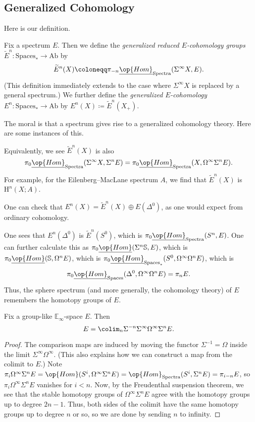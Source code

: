 \documentclass[../notes.tex]{subfiles}
\begin{document}
\subsection{Generalized Cohomology}
Here is our definition.
\begin{definition}
	Fix a spectrum $E$. Then we define the \textit{generalized reduced $E$-coho\-mo\-logy groups} $\widetilde E^n\colon\mathrm{Spaces}_*\to\mathrm{Ab}$ by
	\[\widetilde E^n(X)\coloneqq\pi_{-n}\underline{\op{Hom}}_{\mathrm{Spectra}}(\Sigma^\infty X,E).\]
	(This definition immediately extends to the case where $\Sigma^\infty X$ is replaced by a general spectrum.) We further define the \textit{generalized $E$-cohomology} $E^n\colon\mathrm{Spaces}_*\to\mathrm{Ab}$ by $E^n(X)\coloneqq\widetilde E^n(X_+)$.
\end{definition}
The moral is that a spectrum gives rise to a generalized cohomology theory. Here are some instances of this.
\begin{remark}
	Equivalently, we see $\widetilde E^n(X)$ is also
	\[\pi_0\underline{\op{Hom}}_{\mathrm{Spectra}}(\Sigma^\infty X,\Sigma^nE)=\pi_0\underline{\op{Hom}}_{\mathrm{Spectra}}(X,\Omega^\infty\Sigma^nE).\]
	For example, for the Eilenberg--MacLane spectrum $A$, we find that $\widetilde E^n(X)$ is $\mathrm H^n(X;A)$.
\end{remark}
\begin{remark}
	One can check that $E^n(X)=\widetilde E^n(X)\oplus E\left(\Delta^0\right)$, as one would expect from ordinary cohomology.
\end{remark}
\begin{remark}
	One sees that $E^n\left(\Delta^0\right)$ is $\widetilde E^n\left(S^0\right)$, which is $\pi_0\underline{\op{Hom}}_{\mathrm{Spectra}}(S^n,E)$. One can further calculate this as $\pi_0\underline{\op{Hom}}(\Sigma^n\mathbb S,E)$, which is $\pi_0\underline{\op{Hom}}(\mathbb S,\Omega^nE)$, which is $\pi_0\underline{\op{Hom}}_{\mathrm{Spaces}_*}(S^0,\Omega^\infty\Omega^nE)$, which is
	\[\pi_0\underline{\op{Hom}}_{\mathrm{Spaces}}(\Delta^0,\Omega^\infty\Omega^nE)=\pi_nE.\]
	Thus, the sphere spectrum (and more generally, the cohomology theory) of $E$ remembers the homotopy groups of $E$.
\end{remark}
\begin{lemma} \label{lem:e-infinity-spectra-as-colim}
	Fix a group-like $\mathbb E_\infty$-space $E$. Then
	\[E=\colim_n\Sigma^{-n}\Sigma^\infty\Omega^\infty\Sigma^nE.\]
\end{lemma}
\begin{proof}
	The comparison maps are induced by moving the functor $\Sigma^{-1}=\Omega$ inside the limit $\Sigma^\infty\Omega^\infty$. (This also explains how we can construct a map from the colimit to $E$.) Note $\pi_i\Omega^\infty\Sigma^nE=\op{Hom}(S^i,\Omega^\infty\Sigma^nE)=\op{Hom}_{\mathrm{Spectra}}(S^i,\Sigma^nE)=\pi_{i-n}E$, so $\pi_i\Omega^\infty\Sigma^nE$ vanishes for $i<n$. Now, by the Freudenthal suspension theorem, we see that the stable homotopy groups of $\Omega^\infty\Sigma^nE$ agree with the homotopy groups up to degree $2n-1$. Thus, both sides of the colimit have the same homotopy groups up to degree $n$ or so, so we are done by sending $n$ to infinity.
\end{proof}
\end{document}
